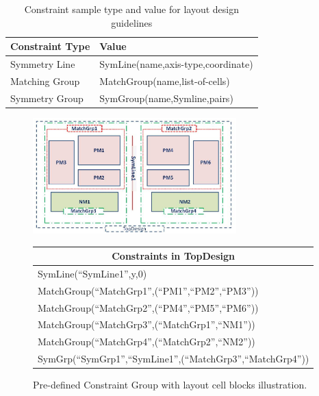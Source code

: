   
    \begin{table}[ht]
      \centering
      \caption{Constraint sample type and value for layout design guidelines}\label{tableConType}
      \begin{scriptsize}
        \begin{tabular}[t]{|l|l|}
          \hline
          Constraint Type & Value \\
          \hline
          Symmetry Line & SymLine(name,axis-type,coordinate)  \\
          \hline
          Matching Group  & MatchGroup(name,list-of-cells)  \\
          \hline
          Symmetry Group  & SymGroup(name,Symline,pairs)  \\
          \hline
        \end{tabular}
      \end{scriptsize}
    \end{table}


    \begin{figure}[ht]
      \centering
        \includegraphics[width=0.7\textwidth]{Fig/CG/PreCG.eps}
      \begin{scriptsize}
      \begin{tabular}[t]{l}
        \toprule
        \multicolumn{1}{c}{Constraints in TopDesign}  \\
        \midrule
        SymLine(``SymLine1'',y,0) \\
        MatchGroup(``MatchGrp1'',(``PM1'',``PM2'',``PM3'')) \\
        MatchGroup(``MatchGrp2'',(``PM4'',``PM5'',``PM6'')) \\
        MatchGroup(``MatchGrp3'',(``MatchGrp1'',``NM1'')) \\
        MatchGroup(``MatchGrp4'',(``MatchGrp2'',``NM2'')) \\
        SymGrp(``SymGrp1'',``SymLine1'',(``MatchGrp3'',``MatchGrp4''))  \\
      \bottomrule
      \end{tabular}
      \end{scriptsize}
      \caption{Pre-defined Constraint Group with layout cell blocks illustration.}
      \label{fig:PreCG}
    \end{figure}
  
